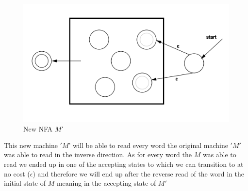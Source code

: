 \begin{figure}[H]
\centering
\includegraphics[scale=0.6]{NFA}
\caption{New NFA $M'$}
\end{figure}


This new machine $'M$' will be able to read every word the original machine $'M'$ was able to read in the inverse direction. As for every word the $M$ was able to read we ended up in one of the accepting states to which we can transition to at no cost ($\epsilon$) and therefore we will end up after the reverse read of the word in the initial state of $M$ meaning in the accepting state of $M'$


